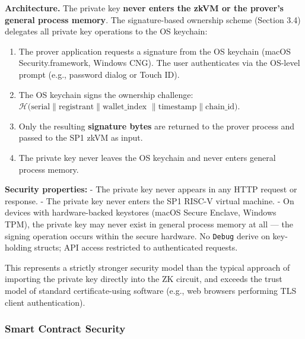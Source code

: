 \documentclass[11pt, a4paper]{article}
\providecommand{\tightlist}{%
  \setlength{\itemsep}{0pt}\setlength{\parskip}{0pt}}
\begin{document}
\textbf{Architecture.} The private key \textbf{never enters the zkVM or
the prover's general process memory}. The signature-based ownership
scheme (Section 3.4) delegates all private key operations to the OS
keychain:

\begin{enumerate}
\def\labelenumi{\arabic{enumi}.}
\tightlist
\item
  The prover application requests a signature from the OS keychain (macOS
  Security.framework, Windows CNG). The user authenticates via the OS-level prompt (e.g., password dialog or Touch ID).
\item
  The OS keychain signs the ownership challenge:
  \(\mathcal{H}(\text{serial} \| \text{registrant} \| \text{wallet\_index}\)
  \(\| \text{timestamp} \| \text{chain\_id})\).
\item
  Only the resulting \textbf{signature bytes} are returned to the prover process and passed to the SP1 zkVM as input.
\item
  The private key never leaves the OS keychain and never enters general process memory.
\end{enumerate}

\textbf{Security properties:} - The private key never appears in any
HTTP request or response. - The private key never enters the SP1 RISC-V
virtual machine. - On devices with hardware-backed keystores (macOS
Secure Enclave, Windows TPM), the private key may never exist in general
process memory at all --- the signing operation occurs within the secure
hardware. No \texttt{Debug} derive on key-holding structs; API access restricted to authenticated requests.

This represents a strictly stronger security model than the typical
approach of importing the private key directly into the ZK circuit, and
exceeds the trust model of standard certificate-using software (e.g.,
web browsers performing TLS client authentication).

\subsubsection{Smart Contract Security}\label{smart-contract-security}
\end{document}
